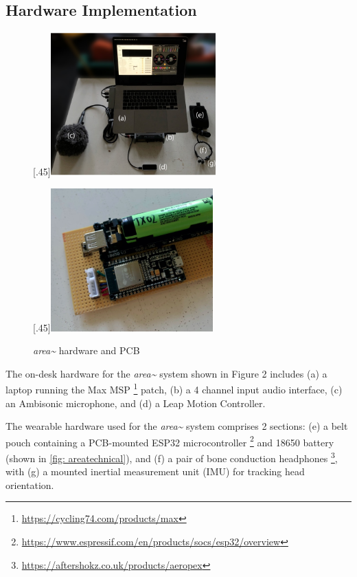 \subsection{Hardware Implementation}            \label{sec: area-system-hardware}
\begin{figure}
    \centering
    \subcaptionbox*{}[.45\textwidth]{\includegraphics[height=5.5cm]{figures/05-area/areatechnical_hardware.png}}%
    
    \subcaptionbox*{}[.45\textwidth]{\includegraphics[height=5.5cm]{figures/05-area/areatechnical_pcb.png}}%
    \caption{\textit{area\textasciitilde{}} hardware and PCB}
    \label{fig: areatechnical}
\end{figure}

The on-desk hardware for the \textit{area\textasciitilde{}} system shown in Figure 2 includes (a) a laptop running the Max MSP \footnote{\url{https://cycling74.com/products/max}} patch, (b) a 4 channel input audio interface, (c) an Ambisonic microphone, and (d) a Leap Motion Controller.

The wearable hardware used for the \textit{area\textasciitilde{}} system comprises 2 sections: (e) a belt pouch containing a PCB-mounted ESP32 microcontroller \footnote{\url{https://www.espressif.com/en/products/socs/esp32/overview}} and 18650 battery (shown in \autoref{fig: areatechnical}), and (f) a pair of bone conduction headphones \footnote{\url{https://aftershokz.co.uk/products/aeropex}}, with (g) a mounted inertial measurement unit (IMU) for tracking head orientation. 

